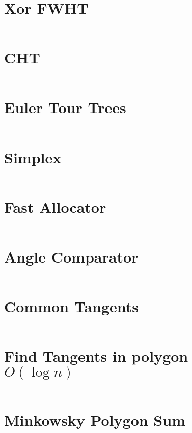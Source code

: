 \documentclass{article}
\begin{document}
\begin{multicols}{2}
\section*{Xor FWHT}
\inputminted[frame=single,breaklines]{cpp}{../fwht.cpp}

\section*{CHT}
\inputminted[frame=single,breaklines]{cpp}{../convex-hull-trick.cpp}

\section*{Euler Tour Trees}
\inputminted[frame=single,breaklines]{cpp}{../euler-tour-trees.cpp}

\section*{Simplex}
\inputminted[frame=single,breaklines]{cpp}{../simplex.cpp}

\section*{Fast Allocator}
\inputminted[frame=single,breaklines]{cpp}{../fast_allocation.cpp}

\section*{Angle Comparator}
\inputminted[frame=single,breaklines]{cpp}{../angle-comparator.cpp}

\section*{Common Tangents}
\inputminted[frame=single,breaklines]{cpp}{../get_common_tangents.cpp}

\section*{Find Tangents in polygon $O(\log n)$}
\inputminted[frame=single,breaklines]{cpp}{../find_tangents_on_convex_polygon_log.cpp}

\section*{Minkowsky Polygon Sum}
\inputminted[frame=single,breaklines]{cpp}{../minkowski-polygons-sum.cpp}


\end{multicols}
\end{document}
